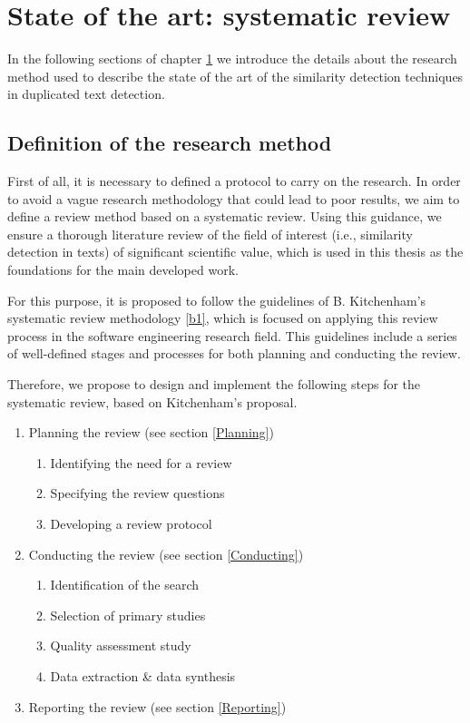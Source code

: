 
\chapter{State of the art: systematic review} %

\label{Chapter2} %


In the following sections of chapter \ref{Chapter2} we introduce the details about the research method used to describe the state of the art of the similarity detection techniques in duplicated text detection.

\section{Definition of the research method}

First of all, it is necessary to defined a protocol to carry on the research. In order to avoid a vague research methodology that could lead to poor results, we aim to define a review method based on a systematic review. Using this guidance, we ensure a thorough literature review of the field of interest (i.e., similarity detection in texts) of significant scientific value, which is used in this thesis as the foundations for the main developed work.

For this purpose, it is proposed to follow the guidelines of B. Kitchenham's systematic review methodology \ref{b1}, which is focused on applying this review process in the software engineering research field. This guidelines include a series of well-defined stages and processes for both planning and conducting the review. 

Therefore, we propose to design and implement the following steps for the systematic review, based on Kitchenham's proposal.

\begin{enumerate}
\item Planning the review (see section \ref{Planning})
\begin{enumerate}
\item Identifying the need for a review
\item Specifying the review questions
\item Developing a review protocol
\end{enumerate}
\item Conducting the review (see section \ref{Conducting})
\begin{enumerate}
\item Identification of the search
\item Selection of primary studies
\item Quality assessment study
\item Data extraction \& data synthesis
\end{enumerate}
\item Reporting the review (see section \ref{Reporting})
\end{enumerate}

